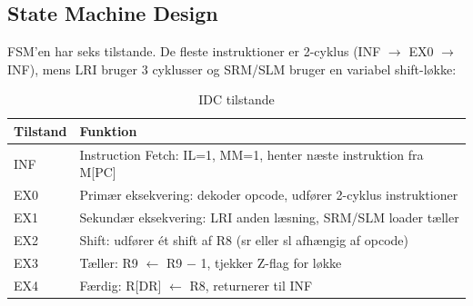 \documentclass{article}
\begin{document}
\subsection{State Machine Design}
\label{sec:idc-fsm}

FSM'en har seks tilstande. De fleste instruktioner er 2-cyklus (INF $\rightarrow$ EX0 $\rightarrow$ INF),
mens LRI bruger 3 cyklusser og SRM/SLM bruger en variabel shift-løkke:

\begin{table}[H]
\centering
\begin{tabular}{|l|l|}
\hline
\textbf{Tilstand} & \textbf{Funktion} \\
\hline
INF & Instruction Fetch: IL=1, MM=1, henter næste instruktion fra M[PC] \\
EX0 & Primær eksekvering: dekoder opcode, udfører 2-cyklus instruktioner \\
EX1 & Sekundær eksekvering: LRI anden læsning, SRM/SLM loader tæller \\
EX2 & Shift: udfører ét shift af R8 (sr eller sl afhængig af opcode) \\
EX3 & Tæller: R9 $\leftarrow$ R9 $-$ 1, tjekker Z-flag for løkke \\
EX4 & Færdig: R[DR] $\leftarrow$ R8, returnerer til INF \\
\hline
\end{tabular}
\caption{IDC tilstande}
\label{tab:idc-states}
\end{table}
\end{document}
